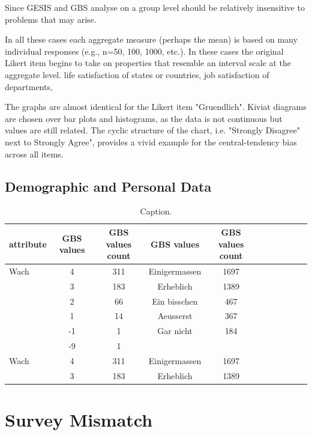 Since GESIS and GBS analyse  on a group level should be relatively insensitive to problems that may arise.

In all these cases each aggregate measure (perhaps the mean) is based on many individual responses (e.g., n=50, 100, 1000, etc.). In these cases the original Likert item begins to take on properties that resemble an interval scale at the aggregate level.
life satisfaction of states or countries,
job satisfaction of departments,

The graphs are almost identical for the Likert item "Gruendlich". Kiviat diagrams are chosen over bar plots and histograms, as the data is not continuous but values are still related. The cyclic structure of the chart, i.e. "Strongly Disagree" next to Strongly Agree", provides a vivid example for the central-tendency bias across all items.

\subsection{Demographic and Personal Data}

\begin{table}[ht]
    \begin{center}
            {\footnotesize
            \begin{tabular}{l|c|ccccccccc}
                \hline \hline
		attribute & GBS values & GBS values count &  GBS values & GBS values count \\
                \hline \hline
                     Wach & 4 & 311 & Einigermassen & 1697 \\
                     & 3 & 183 & Erheblich & 1389 \\
                     & 2 & 66 & Ein bisschen & 467 \\ 
              	& 1 & 14 & Aeusserst & 367 \\	
		& -1 & 1 & Gar nicht & 184 \\		
		& -9 & 1 & & \\
		\hline
		Wach & 4 & 311 & Einigermassen & 1697 \\
                     & 3 & 183 & Erheblich & 1389 \\
            \end{tabular}}
        \caption{Caption.}
\end{center}
\end{table}

\section{Survey Mismatch}

